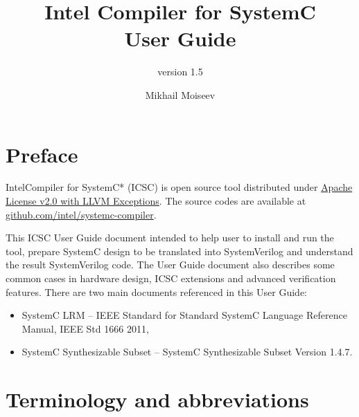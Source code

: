 



\newif\INTEL
 
\title[Intel Compiler for SystemC User Guide]{Intel Compiler for SystemC \\ User Guide}
\subtitle{version 1.5}

\author{Mikhail Moiseev}
\ifdefined\INTEL
\else
{}
\fi


\maketitle
\pagebreak

\setcounter{tocdepth}{2}
\tableofcontents


\pagebreak

\section{Preface}

Intel\textregistered Compiler for SystemC* (ICSC) is open source tool distributed under \href{https://github.com/intel/systemc-compiler/blob/main/LICENSE.txt}{Apache License v2.0 with LLVM Exceptions}. The source codes are available at \href{https://github.com/intel/systemc-compiler}{github.com/intel/systemc-compiler}.

This ICSC User Guide document intended to help user to install and run the tool, prepare SystemC design to be translated into SystemVerilog and understand the result SystemVerilog code. The User Guide document also describes some common cases in hardware design, ICSC extensions and advanced verification features.
%
There are two main documents referenced in this User Guide: 
\begin{itemize}
\item SystemC LRM -- IEEE Standard for Standard SystemC Language Reference Manual, IEEE Std 1666 2011,
\item SystemC Synthesizable Subset -- SystemC Synthesizable Subset Version 1.4.7. 
\end{itemize}

\section{Terminology and abbreviations}


